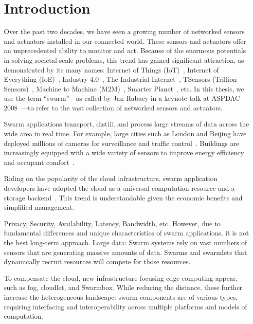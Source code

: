 \documentclass[thesis.tex]{subfiles}
\begin{document}
\chapter{Introduction}

Over the past two decades, we have seen a growing number of networked sensors
and actuators installed in our connected world. These sensors and actuators
offer an unprecedented ability to monitor and act. Because of the enormous
potentials in solving societal-scale problems, this trend has gained significant
attraction, as demonstrated by its many names: Internet of Things
(IoT)~\cite{atzori2010internet}, Internet of Everything
(IoE)~\cite{bradley2013internet}, Industry 4.0~\cite{lasi2014industry}, The
Industrial Internet~\cite{eigner2018industrial}, TSensors (Trillion
Sensors)~\cite{bogue2014towards}, Machine to Machine
(M2M)~\cite{anton2014machine}, Smarter Planet~\cite{palmisano2008smarter}, etc.
In this thesis, we use the term ``swarm''---as called by Jan Rabaey in a keynote
talk at ASPDAC 2008~\cite{rabaey2008brand}---to refer to the vast collection of
networked sensors and actuators.

Swarm applications transport, distill, and process large streams of data across
the wide area in real time. For example, large cities such as London and Beijing
have deployed millions of cameras for surveillance and traffic
control~\cite{skynet, london.surveillance}. Buildings are increasingly equipped
with a wide variety of sensors to improve energy efficiency and occupant
comfort~\cite{krioukov2012building}.

Riding on the popularity of the cloud infrastructure, swarm application
developers have adopted the cloud as a universal computation resource and a
storage backend~\cite{carriots, grovestreams, sami, xively, gupta2014bolt,
  zachariah1001internet}. This trend is understandable given the economic
benefits and simplified management.

Privacy, Security, Availability, Latency, Bandwidth, etc. However, due to
fundamental differences and unique characteristics of swarm applications, it is
not the best long-term approach. Large data: Swarm systems rely on vast numbers
of sensors that are generating massive amounts of data. Swarms and swarmlets
that dynamically recruit resources will compete for those resources.

To compensate the cloud, new infrastructure focusing edge computing appear, such
as fog, cloudlet, and Swarmbox. While reducing the distance, these further
increase the heterogeneous landscape: swarm components are of various types,
requiring interfacing and interoperability across multiple platforms and models
of computation.
\end{document}
